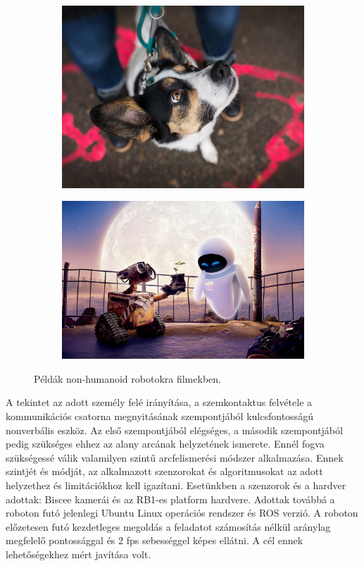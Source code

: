 \begin{figure}
\begin{subfigure}[b]{0.24\linewidth}
    \end{subfigure}
    \begin{subfigure}[b]{0.24\linewidth}
        \includegraphics[width=\linewidth]{figures/eye/dog_attention.jpg}
    \end{subfigure}
    \begin{subfigure}[b]{0.24\linewidth}
        \includegraphics[width=\linewidth]{figures/eye/wp1816244.jpg}
    \end{subfigure}
    \caption{Példák non-humanoid robotokra filmekben.}
    \label{fig:eye_importance}
\end{figure}
A tekintet az adott személy felé irányítása, a szemkontaktus felvétele a kommunikációs csatorna megnyitásának szempontjából kulcsfontosságú nonverbális eszköz. Az első szempontjából elégséges, a második szempontjából pedig szükséges ehhez az alany arcának helyzetének ismerete. Ennél fogva szükségessé válik valamilyen szintű arcfelismerési módszer alkalmazása. Ennek szintjét és módját, az alkalmazott szenzorokat és algoritmusokat az adott helyzethez és limitációkhoz kell igazítani. Esetünkben a szenzorok és a hardver adottak: Biscee kamerái és az RB1-es platform hardvere. Adottak továbbá a roboton futó jelenlegi Ubuntu Linux operációs rendszer és ROS verzió. A roboton előzetesen futó kezdetleges megoldás a feladatot számosítás nélkül aránylag megfelelő pontossággal és 2 fps sebességgel képes ellátni. A cél ennek lehetőségekhez mért javítása volt.

